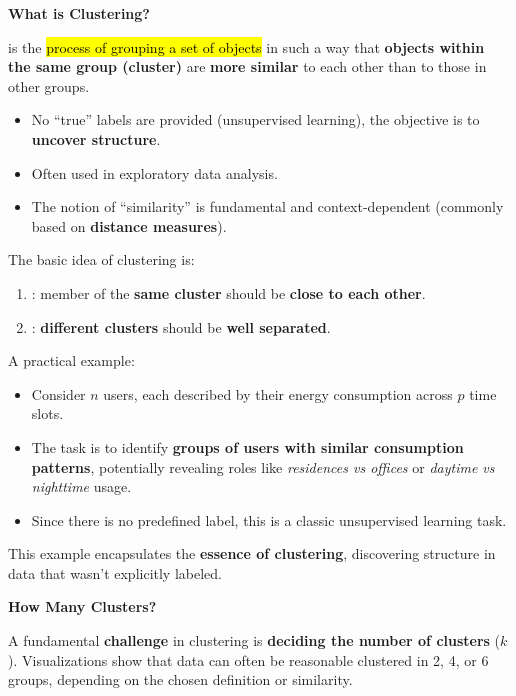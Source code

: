 \highspace
\begin{flushleft}
    \textcolor{Green3}{ \textbf{What is Clustering?}}
\end{flushleft}
 is the \hl{process of grouping a set of objects} in such a way that \textbf{objects within the same group (cluster)} are \textbf{more similar} to each other than to those in other groups.
\begin{itemize}
    \item No ``true'' labels are provided (unsupervised learning), the objective is to \textbf{uncover structure}.
    \item Often used in exploratory data analysis.
    \item The notion of ``similarity'' is fundamental and context-dependent (commonly based on \textbf{distance measures}).
\end{itemize}
The basic idea of clustering is:
\begin{enumerate}
    \item {}: member of the \textbf{same cluster} should be \textbf{close to each other}.
    \item {}: \textbf{different clusters} should be \textbf{well separated}.
\end{enumerate}

\begin{examplebox}
    A practical example:
    \begin{itemize}
        \item Consider $n$ users, each described by their energy consumption across $p$ time slots.
        \item The task is to identify \textbf{groups of users with similar consumption patterns}, potentially revealing roles like \emph{residences vs offices} or \emph{daytime vs nighttime} usage.
        \item Since there is no predefined label, this is a classic unsupervised learning task.
    \end{itemize}
    This example encapsulates the \textbf{essence of clustering}, discovering structure in data that wasn't explicitly labeled.
\end{examplebox}

\highspace
\begin{flushleft}
    \textcolor{Green3}{ \textbf{How Many Clusters?}}
\end{flushleft}
A fundamental \textbf{challenge} in clustering is \textbf{deciding the number of clusters} ($k$). Visualizations show that data can often be reasonable clustered in 2, 4, or 6 groups, depending on the chosen definition or similarity.

